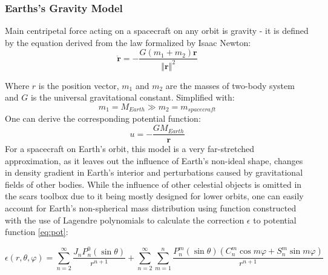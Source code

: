     \subsubsection{Earths's Gravity Model}
        Main centripetal force acting on a spacecraft on any orbit is gravity - it is defined by the equation derived from the law formalized by Isaac Newton:
        \begin{equation}
            \ddot{\textbf{r}} = -\frac{G(m_1+m_2)\textbf{r}}{\left\Vert \textbf{r} \right\Vert^2}
        \end{equation}

        Where $r$ is the position vector, $m_1$ and $m_2$ are the masses of two-body system and $G$ is the universal gravitational constant. Simplified with:
        \begin{equation}
            m_1 = M_{Earth} \gg m_2 = m_{spacecraft}
        \end{equation}
        One can derive the corresponding potential function:
        \begin{equation}
            u = -\frac{GM_{Earth}}{\textbf{r}}\label{eq:pot}
        \end{equation}
        For a spacecraft on Earth's orbit, this model is a very far-stretched approximation, as it leaves out the influence of Earth's non-ideal shape, changes in density gradient in Earth's interior and perturbations caused by gravitational fields of other bodies. While the influence of other celestial objects is omitted in the \ac{scars} toolbox due to it being mostly designed for lower orbits, one can easily account for Earth's non-spherical mass distribution using function constructed with the use of Lagendre polynomials to calculate the correction $\epsilon$ to potential function \eqref{eq:pot}:

        \begin{equation}
            \epsilon(r, \theta, \varphi) = \sum_{n=2}^{\infty}  \frac{J_n P^0_n(\sin\theta) }{r^{n+1}} + \sum_{n=2}^{\infty} \sum_{m=1}^n \frac{ P^m_n(\sin\theta) (C_n^m \cos m\varphi + S_n^m \sin m\varphi)}{r^{n+1}}\label{eq:geopot}
        \end{equation}

